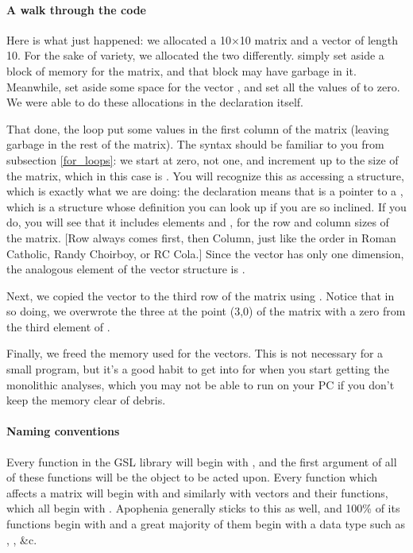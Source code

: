 \paragraph{A walk through the code}
Here is what just happened: we allocated a 10$\times$10 matrix and a vector of
length 10.  For the sake of variety, we  allocated the two differently.
 simply set aside a block of memory for the matrix,
and that block may have garbage in it. Meanwhile,  set
aside some space for the vector , and set all the values of  to
zero.  We were able to do these allocations in the declaration itself.

That done, the  loop put some values in the first column of the matrix (leaving garbage in the rest of the matrix). 
The syntax should be familiar to you from subsection \ref{for_loops}: we start at
zero, not one, and increment up to the size of the matrix, which in this case is
. You will recognize this as accessing a structure, which is exactly
what we are doing: the declaration  means that
 is a pointer to a , which is a structure
whose definition you can look up if you are so inclined. If you do, you
will see that it includes elements  and ,
for the row and column sizes of the matrix. [Row always comes first,
then Column, just like the order in Roman Catholic, Randy Choirboy,
or RC Cola.] Since the vector has only one dimension, the analogous
element of the vector structure is .

Next, we copied the vector to the third row of the matrix using . Notice that in so doing, we
overwrote the three at the point (3,0) of the matrix with a zero from
the third element of .

Finally, we freed the memory used for the vectors. This is not 
necessary for a small program,
but it's a good habit to get into for
when you start getting the monolithic analyses, which you may not be
able to run on your PC if you don't keep the memory clear of debris.

\paragraph{Naming conventions}  
Every function in the GSL library will begin with , and
the first argument of all of these functions will be the object to be acted upon.
Every function which affects a matrix will begin with 
and similarly with vectors and their functions, which all begin with . 
Apophenia generally sticks to this as well, and 100\% of its functions
begin with  and a great majority of them begin with a data
type such as , , \&c.

